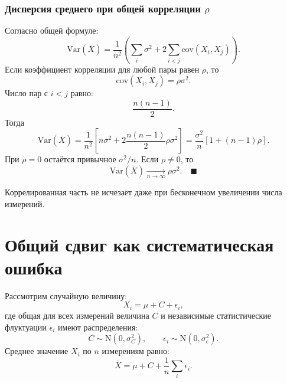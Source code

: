 \documentclass[
  russian,
  12pt,
  a4paper,
  a4paper,
  openany]{scrbook}
\begin{document}
\begin{bookderivation}

\subsubsection{\texorpdfstring{Дисперсия среднего при общей корреляции
\(\rho\)}{Дисперсия среднего при общей корреляции \textbackslash rho}}\label{ux434ux438ux441ux43fux435ux440ux441ux438ux44f-ux441ux440ux435ux434ux43dux435ux433ux43e-ux43fux440ux438-ux43eux431ux449ux435ux439-ux43aux43eux440ux440ux435ux43bux44fux446ux438ux438-rho}

Согласно общей формуле: \[\mathrm{Var}(\overline X)
=
\frac{1}{n^2}
\left(
\sum_i\sigma^2
+2\sum_{i<j}\mathrm{cov}(X_i,X_j)
\right).\] Если коэффициент корреляции для любой пары равен \(\rho\), то
\[\mathrm{cov}(X_i,X_j)=\rho\sigma^2.\] Число пар с \(i<j\) равно:
\[\frac{n(n-1)}{2}.\] Тогда
\[\mathrm{Var}(\overline X)=\frac{1}{n^2}\left[ n\sigma^2+2\frac{n(n-1)}{2}\rho\sigma^2\right]=
\frac{\sigma^2}{n}
\left[1+(n-1)\rho\right].\] При \(\rho=0\) остаётся привычное
\(\sigma^2/n\). Если \(\rho\ne0\), то \[\boxed{
\mathrm{Var}(\overline X)
\xrightarrow[n\to\infty]{}
\rho\sigma^2.
}\quad\blacksquare\]

\end{bookderivation}

Коррелированная часть не исчезает даже при бесконечном увеличении числа
измерений.

\section{Общий сдвиг как систематическая
ошибка}\label{ux43eux431ux449ux438ux439-ux441ux434ux432ux438ux433-ux43aux430ux43a-ux441ux438ux441ux442ux435ux43cux430ux442ux438ux447ux435ux441ux43aux430ux44f-ux43eux448ux438ux431ux43aux430}

Рассмотрим случайную величину: \[X_i=\mu+C+\epsilon_i,\] где общая для
всех измерений величина \(C\) и независимые статистические флуктуации
\(\epsilon_i\) имеют распределения: \[C\sim\mathrm{N}(0,\sigma_C^2),
\qquad
\epsilon_i\sim\mathrm{N}(0,\sigma_\epsilon^2).\] Среднее значение
\(X_i\) по \(n\) измерениям равно: \[\overline X
=
\mu+C+\frac1n\sum_i\epsilon_i.\]
\end{document}
